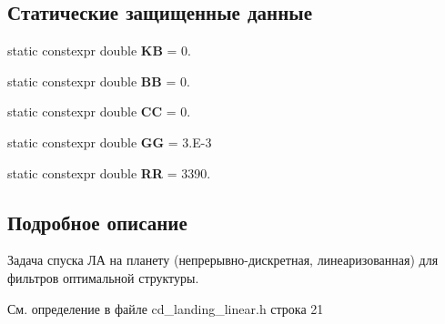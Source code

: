 \subsection*{Статические защищенные данные}
\begin{DoxyCompactItemize}
\item 
static constexpr double {\bfseries KB} = 0.\hypertarget{class_tasks_1_1_continuous_discrete_1_1_landing_linear_a475a823bed7fe3574009ed1c1308cafe}{}\label{class_tasks_1_1_continuous_discrete_1_1_landing_linear_a475a823bed7fe3574009ed1c1308cafe}

\item 
static constexpr double {\bfseries BB} = 0.\hypertarget{class_tasks_1_1_continuous_discrete_1_1_landing_linear_ae874fa8bea9b4af9cdbabf3e69ef09f5}{}\label{class_tasks_1_1_continuous_discrete_1_1_landing_linear_ae874fa8bea9b4af9cdbabf3e69ef09f5}

\item 
static constexpr double {\bfseries CC} = 0.\hypertarget{class_tasks_1_1_continuous_discrete_1_1_landing_linear_ae4c050a50e6c6a62faf559c887f1d78e}{}\label{class_tasks_1_1_continuous_discrete_1_1_landing_linear_ae4c050a50e6c6a62faf559c887f1d78e}

\item 
static constexpr double {\bfseries GG} = 3.\+E-\/3\hypertarget{class_tasks_1_1_continuous_discrete_1_1_landing_linear_ab0db010f0473b66dff76da034fc9d690}{}\label{class_tasks_1_1_continuous_discrete_1_1_landing_linear_ab0db010f0473b66dff76da034fc9d690}

\item 
static constexpr double {\bfseries RR} = 3390.\hypertarget{class_tasks_1_1_continuous_discrete_1_1_landing_linear_a623317fbb8c161c556d5557b4fb91832}{}\label{class_tasks_1_1_continuous_discrete_1_1_landing_linear_a623317fbb8c161c556d5557b4fb91832}

\end{DoxyCompactItemize}


\subsection{Подробное описание}
Задача спуска ЛА на планету (непрерывно-\/дискретная, линеаризованная) для фильтров оптимальной структуры. 

См. определение в файле cd\+\_\+landing\+\_\+linear.\+h строка 21



